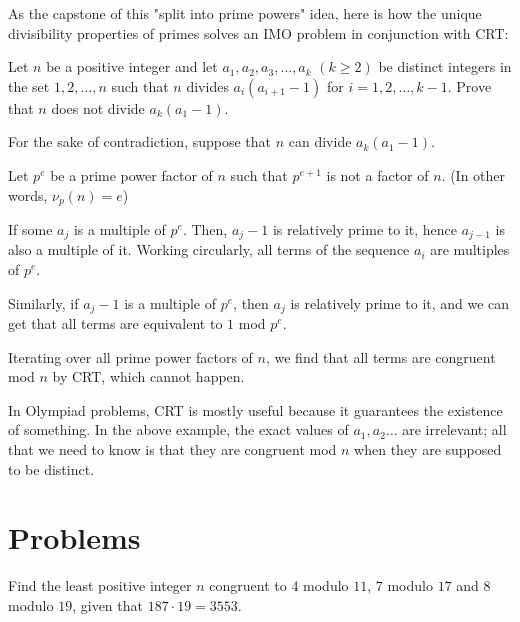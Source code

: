 \documentclass[mast]{lucky}
\begin{document}
As the capstone of this "split into prime powers" idea, here is how the unique divisibility properties of primes solves an IMO problem in conjunction with CRT:
\begin{exam}[IMO 2009/1]
Let $ n$ be a positive integer and let $ a_1,a_2,a_3,\ldots,a_k$ $ ( k\ge 2)$ be distinct integers in the set $ { 1,2,\ldots,n}$ such that $ n$ divides $ a_i(a_{i + 1} - 1)$ for $ i = 1,2,\ldots,k - 1$. Prove that $ n$ does not divide $ a_k(a_1 - 1).$
\end{exam}
\begin{sol}
For the sake of contradiction, suppose that $ n$ can divide $ a_k(a_1 - 1).$

Let $p^{e}$ be a prime power factor of $n$ such that $p^{e+1}$ is not a factor of $n$. (In other words, $\nu_{p}(n)=e$)

If some $a_j$ is a multiple of $p^{e}$. Then, $a_j-1$ is relatively prime to it, hence $a_{j-1}$ is also a multiple of it. Working circularly, all terms of the sequence ${a_i}$ are multiples of $p^e$.

Similarly, if $a_j-1$ is a multiple of $p^e$, then $a_j$ is relatively prime to it, and we can get that all terms are equivalent to $1$ mod $p^e$.

Iterating over all prime power factors of $n$, we find that all terms are congruent mod $n$ by CRT, which cannot happen.
\end{sol}
In Olympiad problems, CRT is mostly useful because it guarantees the existence of something. In the above example, the exact values of $a_1,a_2\ldots$ are irrelevant; all that we need to know is that they are congruent mod $n$ when they are supposed to be distinct.
\pagebreak
\section{Problems}

\begin{prob}[]{1}
Find the least positive integer $n$ congruent to $4$ modulo $11$, $7$ modulo $17$ and $8$ modulo $19$, given that $187\cdot 19=3553$.
\end{prob}
\end{document}
